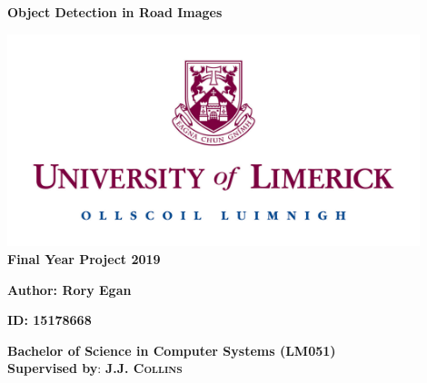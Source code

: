 \documentclass[12pt]{report}
\begin{document}
 \begin{titlepage}
   \begin{center}
        \vspace*{0.5cm}

        \begin{Huge}
        \textbf{Object Detection in Road Images}
        \end{Huge}
        
        \vspace{0.5cm}
        \includegraphics[width=12cm]{ul} \\
    	
    	\normalsize
        \vspace{1.5cm}
        \textbf{Final Year Project 2019} 
        
        \vspace{0.5cm}
        \textbf{Author: Rory Egan}
        
        \vspace{0.5cm}
        \textbf{ID: 15178668}
 
        \vfill
        \textbf{Bachelor of Science in Computer Systems (LM051)} \\
        \normalsize
        \vspace{0.5cm}
        \textbf{Supervised by}: \textsc{\textbf{J.J. Collins}}
 
  \end{center}
 \end{titlepage}
 
\clearpage
\end{document}
